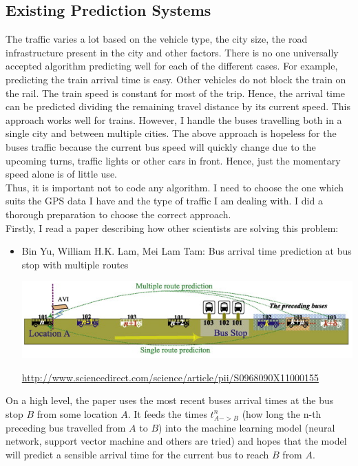 \documentclass[12pt,a4paper,oneside,openright]{report}
\begin{document}
\subsection{Existing Prediction Systems}

The traffic varies a lot based on the vehicle type, the city size, the road
infrastructure present in the city and other factors. There is no one universally
accepted algorithm predicting well for each of the different cases. For example, predicting
the train arrival time is easy. Other vehicles do not block the train on the rail. The train
speed is constant for most of the trip. Hence, the arrival time can be predicted dividing the
remaining travel distance by its current speed. This approach works well for trains. However,
I handle the buses travelling both in a single city and between multiple cities. The above
approach is hopeless for the buses traffic because the current bus speed will quickly
change due to the upcoming turns, traffic lights or other cars in front. Hence, just the
momentary speed alone is of little use. \\

Thus, it is important not to code any algorithm. I need to choose the one which suits
the GPS data I have and the type of traffic I am dealing with. I did a thorough preparation
to choose the correct approach. \\

Firstly, I read a paper describing how other scientists are solving this problem:

\begin{itemize}

\item Bin Yu, William H.K. Lam, Mei Lam Tam: Bus arrival time prediction at
bus stop with multiple routes 

\includegraphics[width=\textwidth]{figs/paper.png}

\textcolor{blue}{\url{http://www.sciencedirect.com/science/article/pii/S0968090X11000155}}

\end{itemize}

On a high level, the paper uses the most recent buses arrival times at the bus stop $B$
from some location $A$. It feeds the times $t^{n}_{A->B}$ (how long the n-th
preceding bus travelled from $A$ to $B$) into the machine learning model (neural network,
support vector machine and others are tried) and hopes that the model will predict a
sensible arrival time for the current bus to reach $B$ from $A$. \\
\end{document}

